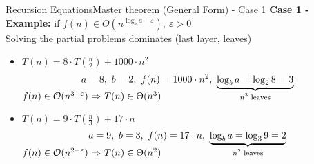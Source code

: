 
\begin{frame}{Recursion Equations}{Master theorem (General Form) - Case 1}
  \textbf{Case 1 - Example:}
  \hfill if {\color{MainA}
    $f(n) \in O(n^{\log_b a-\varepsilon}), ~ \varepsilon > 0$
  }\\
  {\color{gray}Solving the partial problems dominates (last layer, leaves)}
  \vspace{1.0em}
  \begin{itemize}
    \item<3->
      $T(n) = 8 \cdot T(\tfrac{n}{2}) + 1000 \cdot n^2$
      \vspace{-0.5em}
      \begin{displaymath}
        a = 8, ~ b = 2, ~ f(n) = 1000 \cdot n^2, ~
        \smash{\underbrace{
          \log_b a = \log_2 8 = 3
        }_{\text{$n^3$ leaves}}}
      \end{displaymath}
      {\color{MainA}\begin{math}
        f(n) \in \mathcal{O}(n^{3-\varepsilon})$
        $\Rightarrow$
        $T(n) \in \Theta(n^3)
      \end{math}}
      \vspace{1.5em}
    \item<4->
      $T(n) = 9 \cdot T(\tfrac{n}{3}) + 17 \cdot n$
      \vspace{-0.5em}
      \begin{displaymath}
        a = 9, ~ b = 3, ~ f(n) = 17 \cdot n, ~
        \smash{\underbrace{
          \log_b a = \log_3 9 = 2
        }_{\text{$n^2$ leaves}}}
      \end{displaymath}
      {\color{MainA}\begin{math}
        f(n) \in \mathcal{O}(n^{2-\varepsilon})$
        $\Rightarrow$
        $T(n) \in \Theta(n^2)
      \end{math}}
   \end{itemize}
\end{frame}


